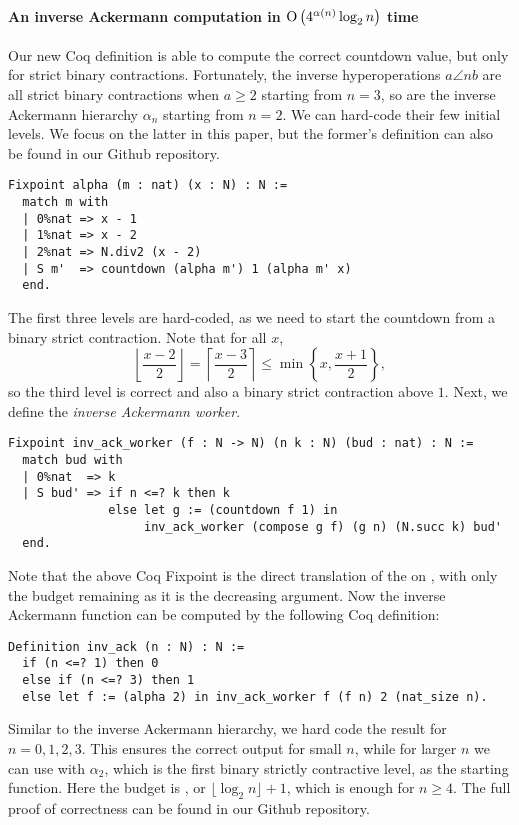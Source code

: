 \paragraph*{An inverse Ackermann computation in $\text{O}\left(4^{\alpha(n)}\log_2 n\right)$ time}
Our new Coq definition is able to compute the correct countdown value, but only for strict binary contractions. Fortunately, the inverse hyperoperations $a\angle{n}b$ are all strict binary contractions when $a\ge 2$ starting from $n = 3$, so are the inverse Ackermann hierarchy $\alpha_n$ starting from $n = 2$. We can hard-code their few initial levels. We focus on the latter in this paper, but the former's definition can also be found in our Github repository.
\begin{lstlisting}
Fixpoint alpha (m : nat) (x : N) : N :=
  match m with
  | 0%nat => x - 1
  | 1%nat => x - 2
  | 2%nat => N.div2 (x - 2)
  | S m'  => countdown (alpha m') 1 (alpha m' x)
  end.
\end{lstlisting}
The first three levels are hard-coded, as we need to start the countdown from a binary strict contraction. Note that for all $x$,
\begin{equation*}
\left\lfloor \frac{x - 2}{2} \right\rfloor = \left\lceil \frac{x - 3}{2} \right\rceil \le \min\left\{x, \frac{x + 1}{2}\right\},
\end{equation*}
so the third level is correct and also a binary strict contraction above $1$. Next, we define the \emph{inverse Ackermann worker}.
\begin{lstlisting}
Fixpoint inv_ack_worker (f : N -> N) (n k : N) (bud : nat) : N :=
  match bud with
  | 0%nat  => k
  | S bud' => if n <=? k then k
              else let g := (countdown f 1) in
                   inv_ack_worker (compose g f) (g n) (N.succ k) bud'
  end.
\end{lstlisting}
Note that the above Coq Fixpoint is the direct translation of the  on , with only the budget remaining  as it is the decreasing argument. Now the inverse Ackermann function can be computed by the following Coq definition:
\begin{lstlisting}
Definition inv_ack (n : N) : N :=
  if (n <=? 1) then 0
  else if (n <=? 3) then 1
  else let f := (alpha 2) in inv_ack_worker f (f n) 2 (nat_size n).
\end{lstlisting}
Similar to the inverse Ackermann hierarchy, we hard code the result for $n = 0,1,2,3$. This ensures the correct output for small $n$, while for larger $n$ we can use  with $\alpha_2$, which is the first binary strictly contractive level, as the starting function. Here the budget is , or $\lfloor \log_2n \rfloor + 1$, which is enough for $n\ge 4$. The full proof of correctness can be found in our Github repository.

